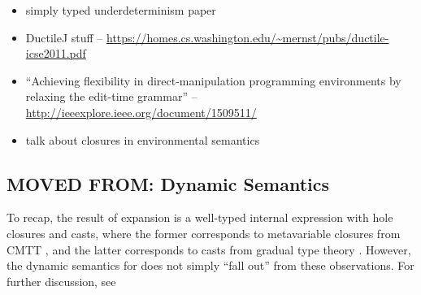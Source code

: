 \begin{itemize}
	\item simply typed underdeterminism paper
	\item DuctileJ stuff -- \url{https://homes.cs.washington.edu/~mernst/pubs/ductile-icse2011.pdf}
	\item ``Achieving flexibility in direct-manipulation programming environments by relaxing the edit-time grammar'' -- \url{http://ieeexplore.ieee.org/document/1509511/}
	\item talk about closures in environmental semantics
\end{itemize}



%
%
%
\subsection{MOVED FROM: Dynamic Semantics}


To recap, the result of expansion is a well-typed internal expression with hole closures and casts, 
where the former corresponds to metavariable closures from CMTT \cite{Nanevski2008}, 
and the latter corresponds to casts from gradual type theory \cite{Siek06a,DBLP:conf/snapl/SiekVCB15}. 
However, the dynamic semantics for \HazelnutLive does not simply ``fall out'' from these observations.
%
For further discussion, see 


